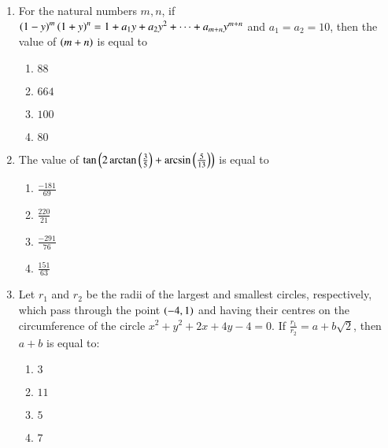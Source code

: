 \documentclass[journal,9pt,onecolumn]{IEEEtran}
\begin{document}
\begin{enumerate}
\setcounter{enumi}{0}
 
    \item For the natural numbers $m,n$, if $\left(1-y\right)^m\left(1+y\right)^n=1+a_1y+a_2y^2+\cdots+a_{m+n}y^{m+n}$ and $a_1=a_2=10$, then the value of $\left(m + n\right)$ is equal to

        \begin{multicols}{4}
            \begin{enumerate}
                \item $88$
                \item $664$
                \item $100$
                \item $80$
            \end{enumerate}
        \end{multicols}

    \item The value of $\tan\left(2\arctan\left(\frac{3}{5}\right)+\arcsin\left(\frac{5}{13}\right)\right)$ is equal to

        \begin{multicols}{2}
            \begin{enumerate}
                \item $\frac{-181}{69}$
                \item $\frac{220}{21}$
                \item $\frac{-291}{76}$
                \item $\frac{151}{63}$
            \end{enumerate}
        \end{multicols}

    \item Let $r_1$ and $r_2$ be the radii of the largest and smallest circles, respectively, which pass through the point $\left(-4,1\right)$ and having their centres on the circumference of the circle $x^2 +y^2+2x+4y-4=0$. If $\frac{r_1}{r_2}=a+b\sqrt{2}$, then $a+b$ is equal to:

        \begin{multicols}{4}
            \begin{enumerate}
                \item $3$
                \item $11$
                \item $5$
                \item $7$
            \end{enumerate}
        \end{multicols}


\end{enumerate}
\end{document}
